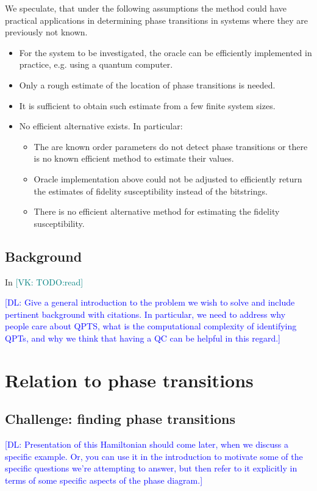 \documentclass[
  american,aps,pra,reprint,floatfix,nofootinbib,superscriptaddress
]{revtex4-2}
\newcommand{\VK}[1]{\textcolor{teal}{[VK: #1]}}
\newcommand{\DL}[1]{\textcolor{blue}{[DL: #1]}}
\begin{document}
We speculate, that under the following assumptions the method could have
practical applications in determining phase transitions in systems where they
are previously not known.
\begin{itemize}
  \item For the system to be investigated, the oracle can be efficiently
    implemented in practice, e.g. using a quantum computer.
  \item Only a rough estimate of the location of phase transitions is needed.
  \item It is sufficient to obtain such estimate from a few finite system
    sizes.
  \item No efficient alternative exists. In particular:
    \begin{itemize}
      \item The are known order parameters do not detect phase transitions
        or there is no known efficient method to estimate their values.
      \item Oracle implementation above could not be adjusted to efficiently
        return the estimates of fidelity susceptibility instead of the
        bitstrings.
      \item There is no efficient alternative method for estimating the
        fidelity susceptibility.
    \end{itemize}
\end{itemize}

\subsection{Background}
In \cite{gu2008fidelity} \VK{TODO:read}

\DL{Give a general introduction to the problem we wish to solve and include pertinent background with citations. In particular, we need to address why people care about QPTS, what is the computational complexity of identifying QPTs, and why we think that having a QC can be helpful in this regard.}

\section{Relation to phase transitions}
\subsection{Challenge: finding phase transitions}

\DL{Presentation of this Hamiltonian should come later, when we discuss a specific example. Or, you can use it in the introduction to motivate some of the specific questions we're attempting to answer, but then refer to it explicitly in terms of some specific aspects of the phase diagram.}
\end{document}
